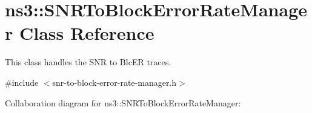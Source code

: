 \hypertarget{classns3_1_1SNRToBlockErrorRateManager}{}\section{ns3\+:\+:S\+N\+R\+To\+Block\+Error\+Rate\+Manager Class Reference}
\label{classns3_1_1SNRToBlockErrorRateManager}


This class handles the S\+NR to Blc\+ER traces.  




{\ttfamily \#include $<$snr-\/to-\/block-\/error-\/rate-\/manager.\+h$>$}



Collaboration diagram for ns3\+:\+:S\+N\+R\+To\+Block\+Error\+Rate\+Manager\+:

